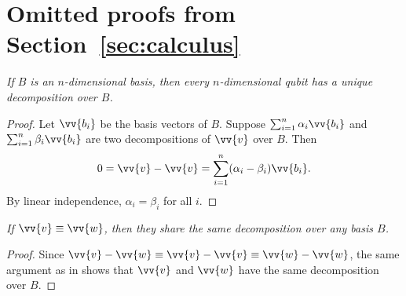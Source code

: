 \documentclass[runningheads,orivec,envcountsame,envcountsect]{llncs}
\begin{document}
%
%
%
%



\clearpage

\makeatletter
\renewcommand*\theHsection{\thesection}
\makeatother
\appendix

\section{Omitted proofs from Section~\ref{sec:calculus}}\label{sec:appendixA}

\begin{restatetheorem}
  \itshape
  If $B$ is an $n$-dimensional basis, then every $n$-dimensional qubit has
  a unique decomposition over $B$.
\end{restatetheorem}
\begin{proof}
  Let $\vv{b_i}$ be the basis vectors of $B$. Suppose
  $\sum_{i=1}^n \alpha_i \vv{b_i}$ and $\sum_{i=1}^n \beta_i \vv{b_i}$
  are two decompositions of $\vv{v}$ over $B$. Then
  \[
    0=\vv{v}-\vv{v}=\sum_{i=1}^{n}(\alpha_i-\beta_i)\vv{b_i}.
  \]
  By linear independence, $\alpha_i=\beta_i$ for all $i$.
\end{proof}

\begin{restatecorollary}
  \itshape
  If $\vv{v}\equiv\vv{w}$, then they share the same decomposition over any
  basis $B$.
\end{restatecorollary}
\begin{proof}
  Since $\vv{v}-\vv{w}\equiv\vv{v}-\vv{v}\equiv\vv{w}-\vv{w}$, the same
  argument as in  shows that $\vv{v}$ and $\vv{w}$ have the
  same decomposition over $B$.
\end{proof}
\end{document}
